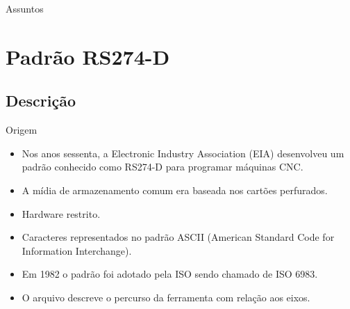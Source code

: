 \documentclass[aspectratio=169]{beamer}
\begin{document}
{%
\begin{frame}{Assuntos}
  \tableofcontents
\end{frame}

\section{Padrão RS274-D}

 \subsection{Descrição}

\begin{frame}{Origem}
  \begin{itemize}
  \item {
    Nos anos sessenta, a Electronic Industry Association (EIA) desenvolveu um 
    padrão conhecido como RS274-D para programar máquinas CNC.
  }
  \item {
    A mídia de armazenamento comum era baseada nos cartões perfurados.
  }
  \item {
    Hardware restrito.
  }
  \item {
    Caracteres representados no padrão ASCII (American Standard Code for Information Interchange).
  }
  \item {
    Em 1982 o padrão foi adotado pela ISO sendo chamado de ISO 6983.
  }
  \item {
    O arquivo descreve o percurso da ferramenta com relação aos eixos.
  }
  \end{itemize}
\end{frame}

}
\end{document}

